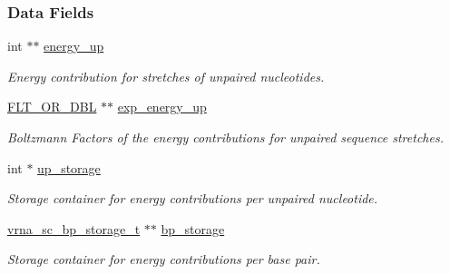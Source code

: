 \subsubsection*{Data Fields}
\begin{DoxyCompactItemize}
\item 
\mbox{\label{group__soft__constraints_a57e4dbb924ab11f304e3762a3a9b07a1}} 
int $\ast$$\ast$ \hyperlink{group__soft__constraints_a57e4dbb924ab11f304e3762a3a9b07a1}{energy\+\_\+up}
\begin{DoxyCompactList}\small\item\em Energy contribution for stretches of unpaired nucleotides. \end{DoxyCompactList}\item 
\mbox{\label{group__soft__constraints_ad3b4972d3b6c23865587e4ac56a37375}} 
\hyperlink{group__data__structures_ga31125aeace516926bf7f251f759b6126}{F\+L\+T\+\_\+\+O\+R\+\_\+\+D\+BL} $\ast$$\ast$ \hyperlink{group__soft__constraints_ad3b4972d3b6c23865587e4ac56a37375}{exp\+\_\+energy\+\_\+up}
\begin{DoxyCompactList}\small\item\em Boltzmann Factors of the energy contributions for unpaired sequence stretches. \end{DoxyCompactList}\item 
\mbox{\label{group__soft__constraints_a16c564d3170b7357620860de1e5faed6}} 
int $\ast$ \hyperlink{group__soft__constraints_a16c564d3170b7357620860de1e5faed6}{up\+\_\+storage}
\begin{DoxyCompactList}\small\item\em Storage container for energy contributions per unpaired nucleotide. \end{DoxyCompactList}\item 
\mbox{\label{group__soft__constraints_a8e261e29462f6bdba3259e5eb61e48e8}} 
\hyperlink{structvrna__sc__bp__storage__t}{vrna\+\_\+sc\+\_\+bp\+\_\+storage\+\_\+t} $\ast$$\ast$ \hyperlink{group__soft__constraints_a8e261e29462f6bdba3259e5eb61e48e8}{bp\+\_\+storage}
\begin{DoxyCompactList}\small\item\em Storage container for energy contributions per base pair. \end{DoxyCompactList}\item 
$$
\end{DoxyCompactItemize}
